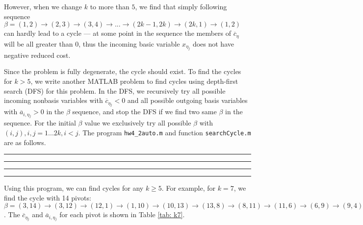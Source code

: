 However, when we change $k$ to more than $5$, we find that simply following sequence $\beta = (1,2) \rightarrow (2, 3) \rightarrow (3, 4) \rightarrow ... \rightarrow (2k-1, 2k) \rightarrow (2k, 1) \rightarrow (1, 2)$ can hardly lead to a cycle --- at some point in the sequence the members of $\overline{c}_{\eta{}}$ will be all greater than 0, thus the incoming basic variable $x_{\eta{}_j}$ does not have negative reduced cost.

Since the problem is fully degenerate, the cycle should exist. To find the cycles for $k>5$, we write another MATLAB problem to find cycles using depth-first search (DFS) for this problem. In the DFS, we recursively try all possible incoming nonbasis variables with $\overline{c}_{\eta{}_j}<0$ and all possible outgoing basis variables with $\overline{a}_{i,\eta{}_j}>0$ in the $\beta$ sequence, and stop the DFS if we find two same $\beta$ in the sequence. For the initial $\beta$ value we exclusively try all possible $\beta$ with $(i,j), i,j=1...2k, i<j$. The program \verb!hw4_2auto.m! and function \verb!searchCycle.m! are as follows.

\bigskip
\hrule 
\small

\normalsize
\hrule
\bigskip

\bigskip
\hrule 
\small

\normalsize
\hrule
\bigskip

Using this program, we can find cycles for any $k\geq5$. For example, for $k=7$, we find the cycle with 14 pivots:  $\beta = (3,14) \rightarrow (3, 12) \rightarrow (12,1) \rightarrow (1,10) \rightarrow (10,13) \rightarrow (13,8) \rightarrow (8, 11) \rightarrow (11,6) \rightarrow  (6,9) \rightarrow  (9,4) \rightarrow  (4,7) \rightarrow  (7,2) \rightarrow  (2,5) \rightarrow  (5,14) \rightarrow  (3,14)$. The $\overline{c}_{\eta{}_j}$ and $\overline{a}_{i,\eta{}_j}$ for each pivot is shown in Table \ref{tab: k7}.

